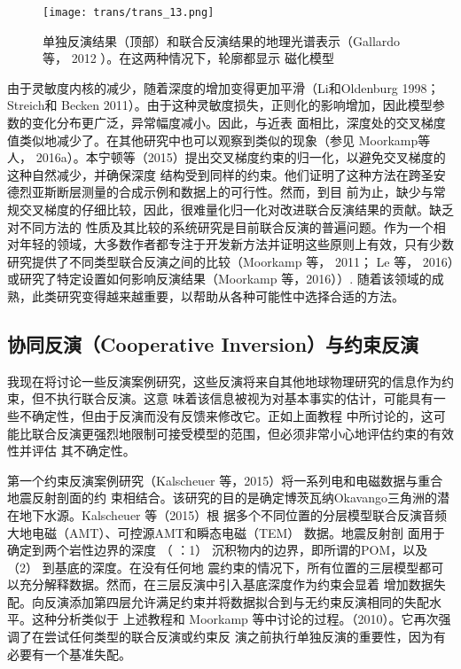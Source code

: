 \begin{figure}[H]
    \centering
    \texttt{[image: trans/trans\_13.png]}
    \setcounter{figure}{5}
    \caption{单独反演结果（顶部）和联合反演结果的地理光谱表示（Gallardo 等， 2012 ）。在这两种情况下，轮廓都显示 磁化模型}\label{trans13}
    
\end{figure}

由于灵敏度内核的减少，随着深度的增加变得更加平滑（Li和Oldenburg 1998；Streich和 Becken 2011）。由于这种灵敏度损失，正则化的影响增加，因此模型参数的变化分布更广泛，异常幅度减小。因此，与近表 面相比，深度处的交叉梯度值类似地减少了。在其他研究中也可以观察到类似的现象（参见 Moorkamp等 人， 2016a）。本宁顿等（2015）提出交叉梯度约束的归一化，以避免交叉梯度的这种自然减少，并确保深度 结构受到同样的约束。他们证明了这种方法在跨圣安德烈亚斯断层测量的合成示例和数据上的可行性。然而，到目 前为止，缺少与常规交叉梯度的仔细比较，因此，很难量化归一化对改进联合反演结果的贡献。缺乏对不同方法的 性质及其比较的系统研究是目前联合反演的普遍问题。作为一个相对年轻的领域，大多数作者都专注于开发新方法并证明这些原则上有效，只有少数研究提供了不同类型联合反演之间的比较（Moorkamp 等， 2011； Le 等， 2016）或研究了特定设置如何影响反演结果（Moorkamp 等，2016））. 随着该领域的成熟，此类研究变得越来越重要，以帮助从各种可能性中选择合适的方法。

\subsection{协同反演（Cooperative Inversion）与约束反演}

我现在将讨论一些反演案例研究，这些反演将来自其他地球物理研究的信息作为约束，但不执行联合反演。这意 味着该信息被视为对基本事实的估计，可能具有一些不确定性，但由于反演而没有反馈来修改它。正如上面教程 中所讨论的，这可能比联合反演更强烈地限制可接受模型的范围，但必须非常小心地评估约束的有效性并评估 其不确定性。

第一个约束反演案例研究（Kalscheuer 等，2015）将一系列电和电磁数据与重合地震反射剖面的约 束相结合。该研究的目的是确定博茨瓦纳Okavango三角洲的潜在地下水源。Kalscheuer 等（2015）根 据多个不同位置的分层模型联合反演音频大地电磁（AMT）、可控源AMT和瞬态电磁（TEM） 数据。地震反射剖 面用于确定到两个岩性边界的深度 （ ：1） 沉积物内的边界，即所谓的POM，以及（2） 到基底的深度。在没有任何地 震约束的情况下，所有位置的三层模型都可以充分解释数据。然而，在三层反演中引入基底深度作为约束会显着 增加数据失配。向反演添加第四层允许满足约束并将数据拟合到与无约束反演相同的失配水平。这种分析类似于 上述教程和 Moorkamp 等中讨论的过程。（2010）。它再次强调了在尝试任何类型的联合反演或约束反 演之前执行单独反演的重要性，因为有必要有一个基准失配。

